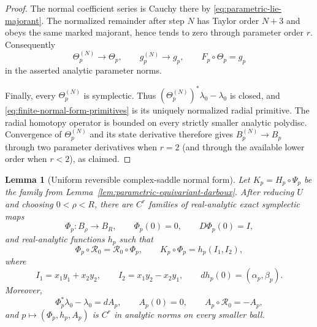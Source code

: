 \documentclass[11pt]{amsart}
\numberwithin{equation}{section}
\newtheorem{lemma}[theorem]{Lemma}
\theoremstyle{definition}
\theoremstyle{remark}
\begin{document}
\begin{proof}
The normal coefficient series is Cauchy there by
\eqref{eq:parametric-lie-majorant}.  The normalized remainder after step
$N$ has Taylor order $N+3$ and obeys the same marked majorant, hence tends
to zero through parameter order $r$.  Consequently
\[
 \Theta_p^{(N)}\longrightarrow\Theta_p,\qquad
 g_p^{(N)}\longrightarrow g_p,\qquad
 F_p\circ\Theta_p=g_p
\]
in the asserted analytic parameter norms.

Finally, every $\Theta_p^{(N)}$ is symplectic.  Thus
$(\Theta_p^{(N)})^*\lambda_0-\lambda_0$ is closed, and
\eqref{eq:finite-normal-form-primitives} is its uniquely normalized radial
primitive.  The radial homotopy operator is bounded on every strictly
smaller analytic polydisc.  Convergence of $\Theta_p^{(N)}$ and its state
derivative therefore gives $B_p^{(N)}\to B_p$ through two parameter
derivatives when $r=2$ (and through the available lower order when
$r<2$), as claimed.
\end{proof}

\begin{lemma}[Uniform reversible complex-saddle normal form]
\label{lem:parametric-reversible-complex-saddle}
Let $K_p=H_p\circ\Psi_p$ be the family from
Lemma~\ref{lem:parametric-equivariant-darboux}.  After reducing $U$ and
choosing $0<\rho<R$, there are $C^r$ families of real-analytic exact
symplectic maps
\[
 \Phi_p:B_\rho\longrightarrow B_R,\qquad
 \Phi_p(0)=0,\qquad D\Phi_p(0)=I,
\]
and real-analytic functions $h_p$ such that
\begin{equation}\label{eq:uniform-reversible-complex-saddle}
 \Phi_p\circ\mathcal R_0=\mathcal R_0\circ\Phi_p,\qquad
 K_p\circ\Phi_p=h_p(I_1,I_2),
\end{equation}
where
\[
 I_1=x_1y_1+x_2y_2,\qquad
 I_2=x_1y_2-x_2y_1,\qquad
 dh_p(0)=(\alpha_p,\beta_p).
\]
Moreover,
\[
 \Phi_p^*\lambda_0-\lambda_0=dA_p,\qquad
 A_p(0)=0,\qquad A_p\circ\mathcal R_0=-A_p,
\]
and $p\mapsto(\Phi_p,h_p,A_p)$ is $C^r$ in analytic norms on every
smaller ball.
\end{lemma}
\end{document}
